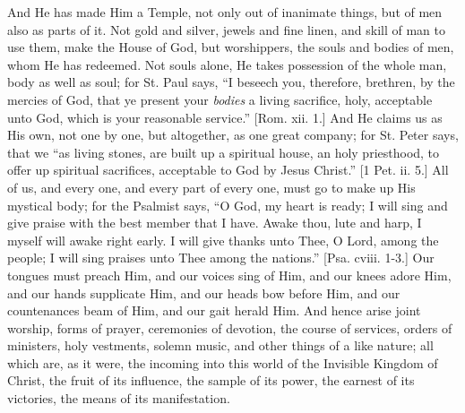 And He has made Him a Temple, not only out of inanimate things, but
of men also as parts of it. Not gold and silver, jewels and fine
linen, and skill of man to use them, make the House of God, but
worshippers, the souls and bodies of men, whom He has redeemed. Not
souls alone, He takes possession of the whole man, body as well as
soul; for St. Paul says, ``I beseech you, therefore, brethren, by
the mercies of God, that ye present your \emph{bodies} a living
sacrifice, holy, acceptable unto God, which is your reasonable
service.'' [Rom. xii. 1.] And He claims us as His own, not one by
one, but altogether, as one great company; for St. Peter says, that we
``as living stones, are built up a spiritual house, an holy
priesthood, to offer up spiritual sacrifices, acceptable to God by
Jesus Christ.'' [1 Pet. ii. 5.] All of us, and every one, and
every part of every one, must go to make up His mystical body; for the
Psalmist says, ``O God, my heart is ready; I will sing and give
praise with the best member that I have. Awake thou, lute and harp, I
myself will awake right early. I will give thanks unto Thee, O Lord,
among the people; I will sing praises unto Thee among the
nations.'' [Psa. cviii. 1-3.] Our tongues must preach Him, and our
voices sing of Him, and our knees adore Him, and our hands supplicate
Him, and our heads bow before Him, and our countenances beam of Him,
and our gait herald Him. And hence arise joint worship, forms of
prayer, ceremonies of devotion, the course of services, orders of
ministers, holy vestments, solemn music, and other things of a like
nature; all which are, as it were, the incoming into this world of the
Invisible Kingdom of Christ, the fruit of its influence, the sample of
its power, the earnest of its victories, the means of its
manifestation.

